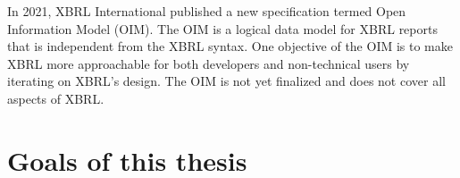 
In 2021, XBRL International published a new specification termed Open Information Model (OIM)\cite{oim}.
The OIM is a logical data model for XBRL reports that is independent from the XBRL syntax.
One objective of the OIM is to make XBRL more approachable for both developers and non-technical users by iterating on XBRL's design.
The OIM is not yet finalized and does not cover all aspects of XBRL. 


\section{Goals of this thesis}
\label{sec:goals}

